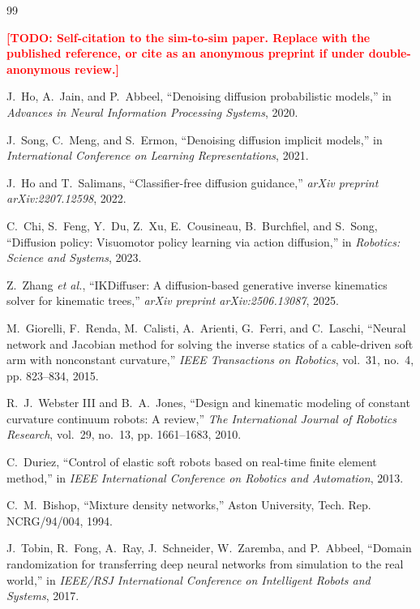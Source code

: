 \documentclass[letterpaper, 10pt, conference]{ieeeconf}
\newcommand{\todo}[1]{\textcolor{red}{\textbf{[TODO: #1]}}}
\begin{document}
\begin{thebibliography}{99}

\todo{Self-citation to the sim-to-sim paper. Replace with the published
reference, or cite as an anonymous preprint if under double-anonymous
review.}

J.~Ho, A.~Jain, and P.~Abbeel, ``Denoising diffusion probabilistic models,''
in \emph{Advances in Neural Information Processing Systems}, 2020.

J.~Song, C.~Meng, and S.~Ermon, ``Denoising diffusion implicit models,'' in
\emph{International Conference on Learning Representations}, 2021.

J.~Ho and T.~Salimans, ``Classifier-free diffusion guidance,'' \emph{arXiv
preprint arXiv:2207.12598}, 2022.

C.~Chi, S.~Feng, Y.~Du, Z.~Xu, E.~Cousineau, B.~Burchfiel, and S.~Song,
``Diffusion policy: Visuomotor policy learning via action diffusion,'' in
\emph{Robotics: Science and Systems}, 2023.

Z.~Zhang \emph{et al.}, ``IKDiffuser: A diffusion-based generative inverse
kinematics solver for kinematic trees,'' \emph{arXiv preprint
arXiv:2506.13087}, 2025.

M.~Giorelli, F.~Renda, M.~Calisti, A.~Arienti, G.~Ferri, and C.~Laschi,
``Neural network and Jacobian method for solving the inverse statics of a
cable-driven soft arm with nonconstant curvature,'' \emph{IEEE Transactions
on Robotics}, vol.~31, no.~4, pp. 823--834, 2015.

R.~J.~Webster III and B.~A.~Jones, ``Design and kinematic modeling of constant
curvature continuum robots: A review,'' \emph{The International Journal of
Robotics Research}, vol.~29, no.~13, pp. 1661--1683, 2010.

C.~Duriez, ``Control of elastic soft robots based on real-time finite element
method,'' in \emph{IEEE International Conference on Robotics and Automation},
2013.

C.~M.~Bishop, ``Mixture density networks,'' Aston University, Tech. Rep.
NCRG/94/004, 1994.

J.~Tobin, R.~Fong, A.~Ray, J.~Schneider, W.~Zaremba, and P.~Abbeel, ``Domain
randomization for transferring deep neural networks from simulation to the
real world,'' in \emph{IEEE/RSJ International Conference on Intelligent
Robots and Systems}, 2017.


\end{thebibliography}
\end{document}

